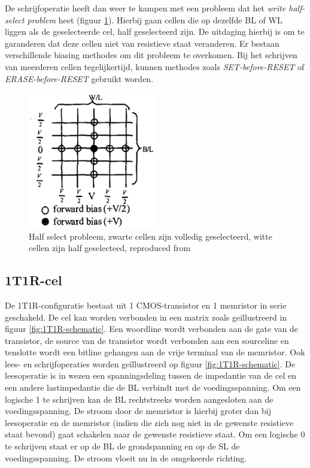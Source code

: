 De schrijfoperatie heeft dan weer te kampen met een probleem dat het \textit{write half-select problem} heet (figuur \ref{fig:halfselct}). Hierbij gaan cellen die op dezelfde BL of WL liggen als de geselecteerde cel, half geselecteerd zijn. De uitdaging hierbij is om te garanderen dat deze cellen niet van resistieve staat veranderen. Er bestaan verschillende biasing methodes \cite{1269425} om dit probleem te overkomen. Bij het schrijven van meerderen cellen tegelijkertijd, kunnen methodes zoals \textit{SET-before-RESET} of \textit{ERASE-before-RESET}\cite{5763125} gebruikt worden.

\begin{figure}
  \centering
  \includegraphics[width=0.5\textwidth]{../fig/hfdstk-cel-halfselect.png}
  \caption[Half select problem]{Half select probleem, zwarte cellen zijn volledig geselecteerd, witte cellen zijn half geselecteed, reproduced from\cite{1269425}}
  \label{fig:halfselct}
\end{figure}

\subsection{1T1R-cel}
\label{1T1R}
De 1T1R-configuratie bestaat uit 1 CMOS-transistor en 1 memristor in serie geschakeld. De cel kan  worden verbonden in een matrix zoals geillustreerd in figuur \ref{fig:1T1R-schematic}. Een woordline wordt verbonden aan de gate van de transistor, de source van de transistor wordt verbonden aan een sourceline en tenslotte wordt een bitline gehangen aan de vrije terminal van de memristor. Ook lees- en schrijfoperaties worden geïllustreerd op figuur \ref{fig:1T1R-schematic}. De leesoperatie is in wezen een spanningsdeling tussen de impedantie van de cel en een andere lastimpedantie die de BL verbindt met de voedingsspanning. Om een logische 1 te schrijven kan de BL rechtstreeks worden aangesloten aan de voedingsspanning. De stroom door de memristor is hierbij groter dan bij leesoperatie en de memristor (indien die zich nog niet in de gewenste resistieve staat bevond) gaat schakelen naar de gewenste resistieve staat. Om een logische 0 te schrijven staat er op de BL de grondspanning en op de SL de voedingsspanning. De stroom vloeit nu in de omgekeerde richting.


